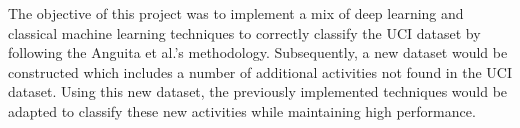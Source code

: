 The objective of this project was to implement a mix of deep learning and classical machine learning techniques to correctly classify the UCI dataset \cite{Anguita2013} by following the Anguita et al.'s methodology.
Subsequently, a new dataset would be constructed which includes a number of additional activities not found in the UCI dataset.
Using this new dataset, the previously implemented techniques would be adapted to classify these new activities while maintaining high performance.
